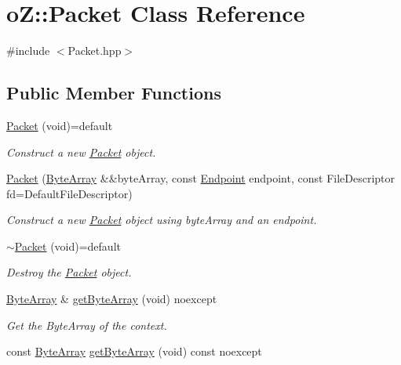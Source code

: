 \hypertarget{classo_z_1_1_packet}{}\section{oZ\+::Packet Class Reference}
\label{classo_z_1_1_packet}


{\ttfamily \#include $<$Packet.\+hpp$>$}

\subsection*{Public Member Functions}
\begin{DoxyCompactItemize}
\item 
\mbox{\hyperlink{classo_z_1_1_packet_a5c96f8d5db686e035b199e8aeb0e0cea}{Packet}} (void)=default
\begin{DoxyCompactList}\small\item\em Construct a new \mbox{\hyperlink{classo_z_1_1_packet}{Packet}} object. \end{DoxyCompactList}\item 
\mbox{\hyperlink{classo_z_1_1_packet_af319d110c50b2f639e97b521ab28dc05}{Packet}} (\mbox{\hyperlink{namespaceo_z_abfa3f5a46e5c7584615dc1dd33fcafb6}{Byte\+Array}} \&\&byte\+Array, const \mbox{\hyperlink{classo_z_1_1_endpoint}{Endpoint}} endpoint, const File\+Descriptor fd=Default\+File\+Descriptor)
\begin{DoxyCompactList}\small\item\em Construct a new \mbox{\hyperlink{classo_z_1_1_packet}{Packet}} object using byte\+Array and an endpoint. \end{DoxyCompactList}\item 
\mbox{\hyperlink{classo_z_1_1_packet_a01d80a0c452b1e07dfd160f494be2af5}{$\sim$\+Packet}} (void)=default
\begin{DoxyCompactList}\small\item\em Destroy the \mbox{\hyperlink{classo_z_1_1_packet}{Packet}} object. \end{DoxyCompactList}\item 
\mbox{\hyperlink{namespaceo_z_abfa3f5a46e5c7584615dc1dd33fcafb6}{Byte\+Array}} \& \mbox{\hyperlink{classo_z_1_1_packet_a8a5d791e4675a3f065928884b64fe7bf}{get\+Byte\+Array}} (void) noexcept
\begin{DoxyCompactList}\small\item\em Get the Byte\+Array of the context. \end{DoxyCompactList}\item 
const \mbox{\hyperlink{namespaceo_z_abfa3f5a46e5c7584615dc1dd33fcafb6}{Byte\+Array}} \mbox{\hyperlink{classo_z_1_1_packet_a4919e1356309ad8c9d7595052d0ca498}{get\+Byte\+Array}} (void) const noexcept

\end{DoxyCompactItemize}
